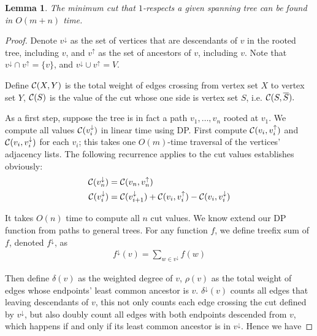 \documentclass[11pt]{article}
\newcommand{\descendants}[1]{#1^\downarrow}
\newcommand{\ancestors}[1]{{#1}^\uparrow}
\newcommand{\cutval}[1]{{\cal C}(#1)}
\newcommand{\crossweight}[2]{{\cal C}(#1,#2)}
\theoremstyle{plain}
\newtheorem{lemma}{Lemma}[section]
\begin{document}
\begin{lemma}
    The minimum cut that $1$-respects a given spanning tree can be found in $O(m+n)$ time.
\end{lemma}

\begin{proof}
    Denote $\descendants{v}$ as the set of vertices that are descendants of $v$ in the rooted tree, including $v$, and $\ancestors{v}$ as the set of ancestors of $v$, including $v$. Note that $\descendants{v}\cap\ancestors{v}=\{v\}$, and $\descendants{v}\cup\ancestors{v}=V$.

    Define $\crossweight{X}{Y}$ is the total weight of edges crossing from vertex set $X$ to vertex set $Y$, $\cutval{S}$ is the value of the cut whose one side is vertex set $S$, i.e. $\crossweight{S}{\overline{S}}.$

    As a first step, suppose the tree is in fact a path $v_1,\ldots,v_n$ rooted at $v_1$.  We compute all values $\cutval{\descendants{v_i}}$ in linear time using DP. First compute $\crossweight{v_i}{\ancestors{v}_i}$ and $\crossweight{v_i}{\descendants{v}_i}$ for each $v_i$; this takes one $O(m)$-time traversal of the vertices' adjacency lists. The following recurrence applies to the cut values establishes obviously:
    \begin{align*}
    \cutval{\descendants{v_n}} &= \crossweight{v_n}{\ancestors{v}_n}\\ 
    \cutval{\descendants{v_i}} &= \cutval{\descendants{v}_{i+1}}+\crossweight{v_i}{\ancestors{v}_i} -\crossweight{v_i}{\descendants{v}_i}
    \end{align*}

    It takes $O(n)$ time to compute all $n$ cut values. We know extend our DP function from paths to general trees. For any function $f$, we define treefix sum of $f$, denoted $\descendants{f}$, as
    \begin{align*}
        \descendants{f}(v)=\sum_{w\in\descendants{v}}f(w)
    \end{align*}

    Then define $\delta(v)$ as the weighted degree of $v$, $\rho(v)$ as the total weight of edges whose endpoints' least common ancestor is $v$. $\descendants{\delta}(v)$ counts all edges that leaving descendants of $v$, this not only counts each edge crossing the cut defined by $\descendants{v}$, but also doubly count all edges with both endpoints descended from $v$, which happens if and only if its least common ancestor is in $\descendants{v}$. Hence we have


\end{proof}
\end{document}
